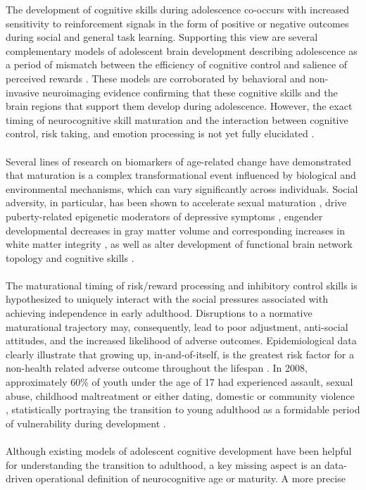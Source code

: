 \documentclass[utf8]{frontiersSCNS} %
\begin{document}
The development of cognitive skills during adolescence co-occurs with increased sensitivity to reinforcement signals in the form of positive or negative outcomes during social and general task learning. Supporting this view are several complementary models of adolescent brain development describing adolescence as a period of mismatch between the efficiency of cognitive control and salience of perceived rewards \citep{Steinberg2010, CaseyEtAl2008, LunaWright2016, rosenbaum2020valence}. These models are corroborated by behavioral and non-invasive neuroimaging evidence confirming that these cognitive skills and the brain regions that support them develop during adolescence.  However, the exact timing of neurocognitive skill maturation and the interaction between cognitive control, risk taking, and emotion processing is not yet fully elucidated \citep{shulman2016dual, duell2016interaction}.\paragraph*{} Several lines of research on biomarkers of age-related change have demonstrated that maturation is a complex transformational event influenced by biological and environmental mechanisms, which can vary significantly across individuals. Social adversity, in particular, has been shown to accelerate sexual maturation \citep{rickard2014childhood}, drive puberty-related epigenetic moderators of depressive symptoms \citep{sumner2019early}, engender developmental decreases in gray matter volume and corresponding increases in white matter integrity \citep{gur2019burden, Gogtay2004}, as well as alter development of functional brain network topology \citep{tooley2020associations} and cognitive skills \citep{mclaughlin2019childhood, belsky2019early}. \paragraph*{} The maturational timing of risk/reward processing and inhibitory control skills is hypothesized to uniquely interact with the social pressures associated with achieving independence in early adulthood. Disruptions to a normative maturational trajectory may, consequently, lead to poor adjustment, anti-social attitudes, and the increased likelihood of adverse outcomes. Epidemiological data clearly illustrate that growing up, in-and-of-itself, is the greatest risk factor for a non-health related adverse outcome throughout the lifespan \citep{turner2006effect}. In 2008, approximately 60\% of youth under the age of 17 had experienced assault, sexual abuse, childhood maltreatment or either dating, domestic or community violence \citep{finkelhor2009children}, statistically portraying the transition to young adulthood as a formidable period of vulnerability during development \citep*{berzin2010vulnerability}. \paragraph*{} Although existing models of adolescent cognitive development have been helpful for understanding the transition to adulthood, a key missing aspect is an data-driven operational definition of neurocognitive age or maturity. A more precise 
\end{document}
